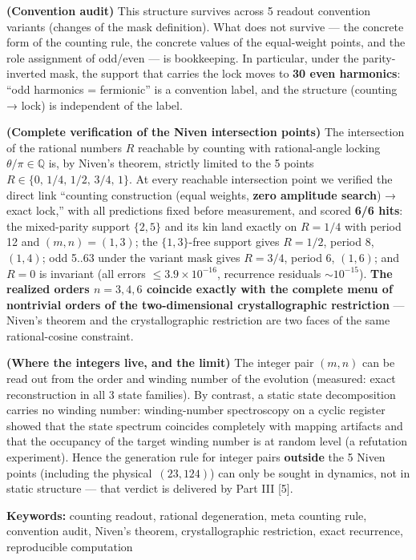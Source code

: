 \documentclass[
  a4paper,
]{article}
\begin{document}
\textbf{(Convention audit)} This structure survives across 5 readout
convention variants (changes of the mask definition). What does not
survive --- the concrete form of the counting rule, the concrete values
of the equal-weight points, and the role assignment of odd/even --- is
bookkeeping. In particular, under the parity-inverted mask, the support
that carries the lock moves to \textbf{30 even harmonics}: ``odd
harmonics = fermionic'' is a convention label, and the structure
(counting → lock) is independent of the label.

\textbf{(Complete verification of the Niven intersection points)} The
intersection of the rational numbers \(R\) reachable by counting with
rational-angle locking \(\theta/\pi\in\mathbb{Q}\) is, by Niven's
theorem, strictly limited to the 5 points
\(R\in\{0,\,1/4,\,1/2,\,3/4,\,1\}\). At every reachable intersection
point we verified the direct link ``counting construction (equal
weights, \textbf{zero amplitude search}) → exact lock,'' with all
predictions fixed before measurement, and scored \textbf{6/6 hits}: the
mixed-parity support \(\{2,5\}\) and its kin land exactly on \(R=1/4\)
with period 12 and \((m,n)=(1,3)\); the \(\{1,3\}\)-free support gives
\(R=1/2\), period 8, \((1,4)\); odd 5..63 under the variant mask gives
\(R=3/4\), period 6, \((1,6)\); and \(R=0\) is invariant (all errors
\(\le3.9\times10^{-16}\), recurrence residuals \(\sim10^{-15}\)).
\textbf{The realized orders \(n=3,4,6\) coincide exactly with the
complete menu of nontrivial orders of the two-dimensional
crystallographic restriction} --- Niven's theorem and the
crystallographic restriction are two faces of the same rational-cosine
constraint.

\textbf{(Where the integers live, and the limit)} The integer pair
\((m,n)\) can be read out from the order and winding number of the
evolution (measured: exact reconstruction in all 3 state families). By
contrast, a static state decomposition carries no winding number:
winding-number spectroscopy on a cyclic register showed that the state
spectrum coincides completely with mapping artifacts and that the
occupancy of the target winding number is at random level (a refutation
experiment). Hence the generation rule for integer pairs
\textbf{outside} the 5 Niven points (including the physical
\(\,(23,124)\)) can only be sought in dynamics, not in static structure
--- that verdict is delivered by Part III {[}5{]}.

\textbf{Keywords:} counting readout, rational degeneration, meta
counting rule, convention audit, Niven's theorem, crystallographic
restriction, exact recurrence, reproducible computation
\end{document}
